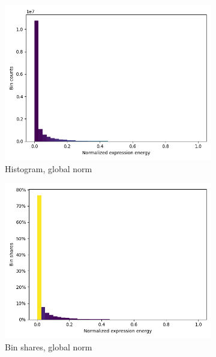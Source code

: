 \documentclass[]{article}
\begin{document}
\begin{figure}
	\centering
	\begin{subfigure}{.45\textwidth}
		\centering
		\includegraphics[width=.9\linewidth]{plotted_figures/global_normal_ge_data_histo.png}
		\caption{Histogram, global norm}
		\label{fig:global_hist}
	\end{subfigure}
	\begin{subfigure}{.45\textwidth}
		\centering
		\includegraphics[width=.9\linewidth]{plotted_figures/global_percent_ge_data_histo.png}
		\caption{Bin shares, global norm}
		\label{fig:global_perc}
	\end{subfigure}\\
	\begin{subfigure}{.45\textwidth}
		\centering

\end{subfigure}
\end{figure}
\end{document}
